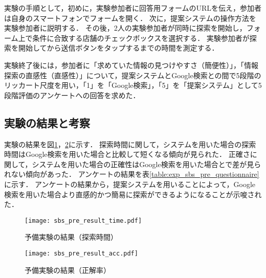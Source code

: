     実験の手順として，初めに，実験参加者に回答用フォームのURLを伝え，参加者は自身のスマートフォンでフォームを開く．
    次に，提案システムの操作方法を実験参加者に説明する．
    その後，2人の実験参加者が同時に探索を開始し，フォーム上で条件に合致する店舗のチェックボックスを選択する．
    実験参加者が探索を開始してから送信ボタンをタップするまでの時間を測定する．
    
    実験終了後には，参加者に「求めていた情報の見つけやすさ（簡便性）」，「情報探索の直感性（直感性）」について，提案システムとGoogle検索との間で5段階のリッカート尺度を用い，「1」を「Google検索」，「5」を「提案システム」として5段階評価のアンケートへの回答を求めた．

  \subsection{実験の結果と考察}
    実験の結果を図\ref{figure:exp_sbs_pre_result_time}，\ref{figure:exp_sbs_pre_result_acc}に示す．
    探索時間に関して，システムを用いた場合の探索時間はGoogle検索を用いた場合と比較して短くなる傾向が見られた．
    正確さに関して，システムを用いた場合の正確性はGoogle検索を用いた場合とで差が見られない傾向があった．
    アンケートの結果を表\ref{table:exp_sbs_pre_questionnaire}に示す．
    アンケートの結果から，提案システムを用いることによって，Google検索を用いた場合より直感的かつ簡易に探索ができるようになることが示唆された．

    \begin{figure}[tb]
      \begin{center}
        \texttt{[image: sbs\_pre\_result\_time.pdf]}
        \caption{予備実験の結果（探索時間）}
        \label{figure:exp_sbs_pre_result_time}
      \end{center}
    \end{figure}
    \begin{figure}[tb]
      \begin{center}
        \texttt{[image: sbs\_pre\_result\_acc.pdf]}
        \caption{予備実験の結果（正解率）}
        \label{figure:exp_sbs_pre_result_acc}
      \end{center}
    \end{figure}

